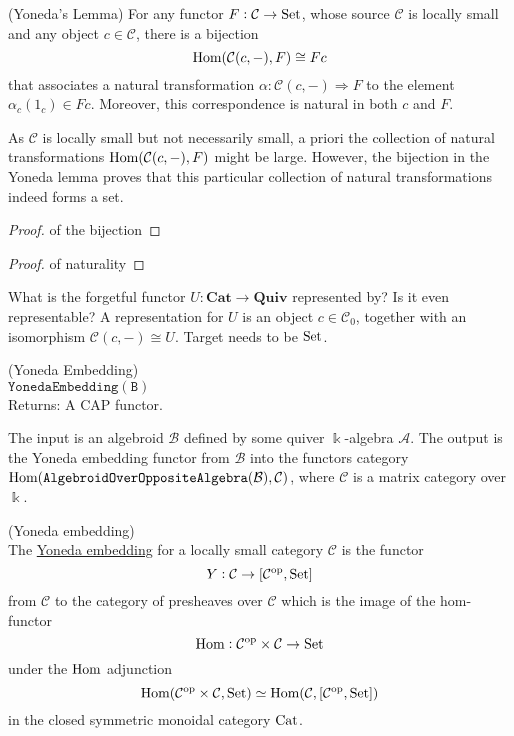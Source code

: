 \begin{lemma}{(Yoneda's Lemma)}
For any functor $F : \mathcal{C} \rightarrow \textup{Set}$, whose source $\mathcal{C}$ is locally small and any
object $c \in \mathcal{C}$, there is a bijection
\[
\textup{Hom}(\mathcal{C}(c,-), F) \cong Fc
\]
that associates a natural transformation $\alpha : \mathcal{C}(c,-) \Rightarrow F$ to the element $\alpha_{c}(1_{c}) \in Fc$.
Moreover, this correspondence is natural in both $c$ and $F$.
\end{lemma}
As $\mathcal{C}$ is locally small but not necessarily small, a priori the collection of natural transformations
$\textup{Hom}(\mathcal{C}(c,-),F)$ might be large. However, the bijection in the Yoneda lemma proves that this particular
collection of natural transformations indeed forms a set.
\begin{proof}{of the bijection}

\end{proof}
\begin{proof}{of naturality}

\end{proof}

What is the forgetful functor $U : \mathbf{Cat} \rightarrow \mathbf{Quiv}$ represented by? Is it even representable?
A representation for $U$ is an object $c \in \mathcal{C}_{0}$, together with an isomorphism $\mathcal{C}(c,-) \cong U$.
Target needs to be $\textup{Set}$.


\begin{definition}{(Yoneda Embedding)}\label{def_func:yoneda_embedding}\\
$\mathtt{YonedaEmbedding(B)}$\\
Returns: A \textsc{CAP} functor.

\noindent The input is an algebroid $\mathcal{B}$ defined by some quiver $\Bbbk$-algebra $\mathcal{A}$. The output is the Yoneda embedding functor
from $\mathcal{B}$ into the functors category $\textup{Hom}( \mathtt{AlgebroidOverOppositeAlgebra}(\mathcal{B}), \mathcal{C} )$, where
$\mathcal{C}$ is a matrix category over $\Bbbk$.
\end{definition}

\begin{definition}{(Yoneda embedding)}\label{def:yoneda_embedding}\\
The \ul{Yoneda embedding} for a locally small category $\mathcal{C}$ is the functor
\[
Y : \mathcal{C} \rightarrow [\mathcal{C}^{\text{op}}, \textup{Set}]
\]
from $\mathcal{C}$ to the category of presheaves over $\mathcal{C}$ which is the image of the hom-functor
\[
\textup{Hom} : \mathcal{C}^{\text{op}}\times\mathcal{C} \rightarrow \textup{Set}
\]
under the $\textup{Hom}$ adjunction
\[
\textup{Hom}(\mathcal{C}^{\text{op}}\times\mathcal{C}, \textup{Set}) \simeq \textup{Hom}(\mathcal{C},[\mathcal{C}^{\text{op}}, \textup{Set}])
\]
in the closed symmetric monoidal category $\textup{Cat}$.
\end{definition}

